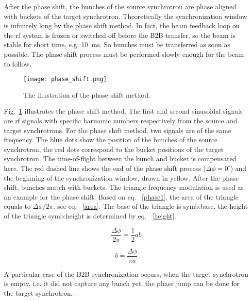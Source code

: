 After the phase shift, the bunches of the source synchrotron are phase aligned with buckets of the target synchrotron. Theoretically the synchronization window is infinitely long by the phase shift method. In fact, the beam feedback loop on the rf system is frozen or switched off before the B2B transfer, so the beam is stable for short time, e.g. \SI{10}{ms}. So bunches must be transferred as soon as possible. The phase shift process must be performed slowly enough for the beam to follow. 

\begin{figure}[!htb]
   \centering   
   \texttt{[image: phase\_shift.png]}
   \caption{The illustration of the phase shift method.}
   \label{phase_shift}
\end{figure}


Fig.~\ref{phase_shift} illustrates the phase shift method. The first and second sinusoidal signals are rf signals with specific harmonic numbers respectively from the source and target synchrotrons. For the phase shift method, two signals are of the same frequency. The blue dots show the position of the bunches of the source synchrotron, the red dots correspond to the bucket positions of the target synchrotron. The time-of-flight between the bunch and bucket is compensated here. The red dashed line shows the end of the phase shift process ($\Delta \phi=0^\circ$) and the beginning of the synchronization window, drawn in yellow. After the phase shift, bunches match with buckets. The triangle frequency modulation is used as an example for the phase shift. Based on eq. ~\ref{phase1}, the area of the triangle equals to $\Delta \phi/2\pi$, see eq. ~\ref{area}. The base of the triangle is \gls{symb:base}, the height of the triangle \gls{symb:height} is determined by eq. ~\ref{height}.  

\begin{equation}
\frac{\Delta \phi}{2\pi}=\frac{1}{2}ab \label{area}
\end{equation}

\begin{equation}
b= \frac{\Delta \phi}{\pi a}\label{height}
\end{equation}

A particular case of the B2B synchronization occurs, when the target synchrotron is empty, i.e. it did not capture any bunch yet, the phase jump can be done for the target synchrotron.

